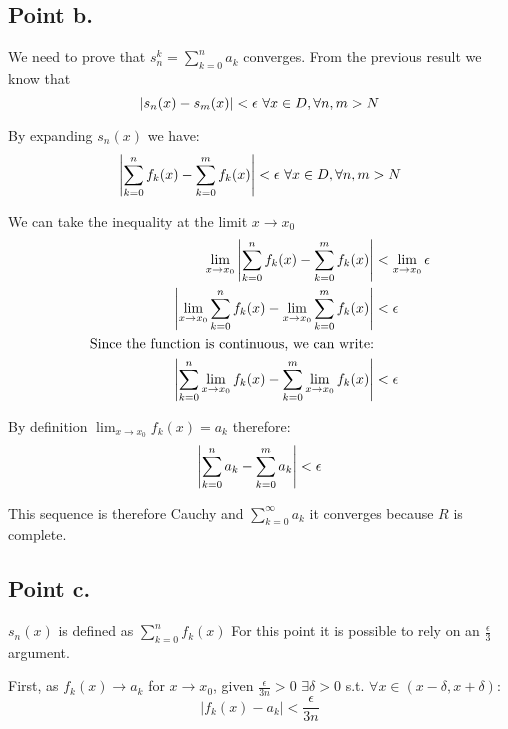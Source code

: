 \begin{homeworkProblem}
\subsection{Point b.}
We need to prove that $s_{n}^{k} = \sum_{k=0}^{n}a_{k}$ converges.
From the previous result we know that
\begin{equation}
    \left\lvert s_{n}(x)-s_{m}(x)\right\rvert < \epsilon \ \forall x \in D, \forall n,m > N
\end{equation}

By expanding $s_{n}(x)$ we have:
\begin{equation}
    \left\lvert\sum_{k=0}^{n}f_{k}(x)-\sum_{k=0}^{m}f_{k}(x)\right\rvert< \epsilon \ \forall x \in D, \forall n,m > N
\end{equation}

We can take the inequality at the limit $x \rightarrow x_{0}$
\begin{equation}
    \begin{split}
         \lim_{x \rightarrow x_{0}} \left\lvert\sum_{k=0}^{n}f_{k}(x)-\sum_{k=0}^{m}f_{k}(x)\right\rvert & < \lim_{x \rightarrow x_{0}} \epsilon \\
         \left\lvert\lim_{x \rightarrow x_{0}} \sum_{k=0}^{n}f_{k}(x)-\lim_{x \rightarrow x_{0}} \sum_{k=0}^{m}f_{k}(x)\right\rvert & < \epsilon\\
\text{Since the function is continuous, we can write:}\\
         \left\lvert\sum_{k=0}^{n} \lim_{x \rightarrow x_{0}} f_{k}(x)- \sum_{k=0}^{m} \lim_{x \rightarrow x_{0}} f_{k}(x)\right\rvert & < \epsilon \\
    \end{split}
\end{equation}

By definition $\lim_{x \rightarrow x_{0}} f_{k}(x)= a_{k}$ therefore:
\begin{equation}
    \left\lvert\sum_{k=0}^{n} a_{k} - \sum_{k=0}^{m} a_{k}\right\rvert < \epsilon 
\end{equation}

This sequence is therefore Cauchy and $\sum_{k=0}^{\infty} a_{k}$ it converges because $R$ is complete.

\subsection{Point c.}
$s_{n}(x)$ is defined as $\sum_{k=0}^{n}f_{k}(x)$
For this point it is possible to rely on an $\frac{\epsilon}{3}$ argument. 

First, as $f_k(x) \to a_k$ for $x \to x_0$, given $\frac{\epsilon}{3n} > 0$  $\exists \delta > 0$ s.t. $\forall x \in (x - \delta, x + \delta)$: 
\begin{equation}
   \left| f_k(x) - a_k\right| < \frac{\epsilon}{3n}
\end{equation}


\end{homeworkProblem}
